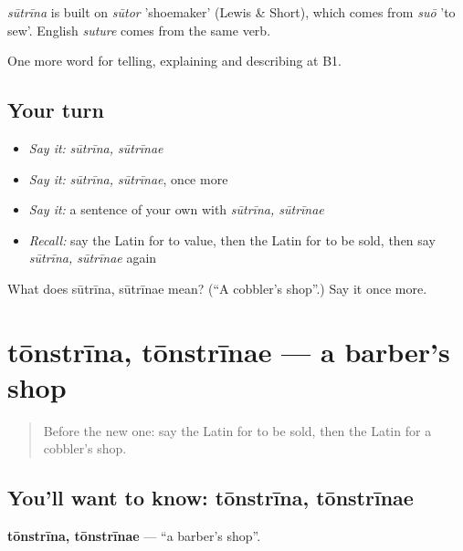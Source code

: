 \begin{cousinweb}
\emph{sūtrīna} is built on \emph{sūtor} 'shoemaker' (Lewis \& Short), which comes from \emph{suō} 'to sew'. English \emph{suture} comes from the same verb.
\end{cousinweb}

\begin{grammarlens}[title={What you've built}]
One more word for telling, explaining and describing at B1.
\end{grammarlens}

\subsection*{Your turn}
\begin{itemize}
\raggedright
  \item \emph{Say it:} \emph{sūtrīna, sūtrīnae}
  \item \emph{Say it:} \emph{sūtrīna, sūtrīnae}, once more
  \item \emph{Say it:} a sentence of your own with \emph{sūtrīna, sūtrīnae}
  \item \emph{Recall:} say the Latin for to value, then the Latin for to be sold, then say \emph{sūtrīna, sūtrīnae} again
\end{itemize}

\begin{tcolorbox}[breakable,colback=teal!4,colframe=teal!35!black,title={Before you move on}]
What does sūtrīna, sūtrīnae mean? (\textquotedblleft{}A cobbler's shop\textquotedblright{}.) Say it once more.
\end{tcolorbox}
\section[tōnstrīna, tōnstrīnae]{tōnstrīna, tōnstrīnae — a barber's shop}

\label{lesson:LA-C467-tonstrina}



\begin{quote}
Before the new one: say the Latin for to be sold, then the Latin for a cobbler's shop.
\end{quote}

\subsection*{You'll want to know: tōnstrīna, tōnstrīnae}
\textbf{tōnstrīna, tōnstrīnae} — \textquotedblleft{}a barber's shop\textquotedblright{}.

